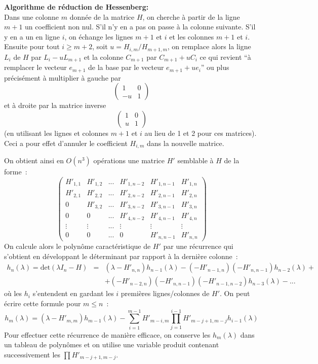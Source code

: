 \documentclass[a4paper,11pt]{article}
\begin{document}
\begin{giacjshere}
{\bf Algorithme de réduction de Hessenberg:}\\
Dans une colonne $m$ donnée de la matrice $H$, 
on cherche à partir de la ligne
$m+1$ un coefficient non nul. S'il n'y en a pas on passe à la colonne
suivante. S'il y en a un en ligne $i$, on échange les lignes $m+1$
et $i$ et les colonnes $m+1$ et $i$. Ensuite pour tout $i\geq m+2$,
soit $u=H_{i,m}/H_{m+1,m}$, on remplace alors la ligne $L_i$ de $H$
par $L_i-uL_{m+1}$ et la colonne $C_{m+1}$ par $C_{m+1}+uC_i$
ce qui revient ``à remplacer le vecteur $e_{m+1}$ de la base
par le vecteur $e_{m+1}+ue_i$'' ou plus pr\'ecis\'ement
\`a multiplier \`a gauche par 
$$\left(\begin{array}{cc}
1 & 0 \\ -u & 1\end{array}\right)$$ 
et \`a droite par la matrice inverse
$$\left(\begin{array}{cc}
1 & 0 \\ u & 1\end{array}\right)$$ 
(en utilisant les lignes et colonnes
$m+1$ et $i$ au lieu de 1 et 2 pour ces matrices). 
Ceci a pour effet d'annuler le coefficient $H_{i,m}$
dans la nouvelle matrice.

On obtient ainsi en $O(n^3)$ opérations
une matrice $H'$ semblable à $H$ de la forme~:
\[
\left(\begin{array}{cccccc}
H'_{1,1} & H'_{1,2} & ... & H'_{1,n-2} & H'_{1,n-1} & H'_{1,n}\\
H'_{2,1} & H'_{2,2} & ... & H'_{2,n-2} & H'_{2,n-1} & H'_{2,n} \\
0       & H'_{3,2} & ... & H'_{3,n-2} & H'_{3,n-1} & H'_{3,n} \\
0       & 0       & ... & H'_{4,n-2} & H'_{4,n-1} & H'_{4,n} \\
\vdots  & \vdots  & ... & \vdots & \vdots  &  \vdots \\
0       & 0       & ... & 0 & H'_{n,n-1} & H'_{n,n}
\end{array} \right)
\]
On calcule alors le polynôme caractéristique de $H'$ par une récurrence
qui s'obtient en développant le déterminant par rapport à la derni\`ere
colonne~:
\begin{eqnarray*}
 h_n(\lambda) = \mbox{det}(\lambda I_n-H)&=& 
(\lambda-H'_{n,n}) h_{n-1}(\lambda) -(-H'_{n-1,n}) (-H'_{n,n-1}) 
h_{n-2}(\lambda) + \\
& & 
    + (-H'_{n-2,n}) (-H'_{n,n-1}) (-H'_{n-1,n-2}) h_{n-3}(\lambda) - ...
\end{eqnarray*}
où les $h_i$ s'entendent en gardant les $i$ premières lignes/colonnes de $H'$.
On peut \'ecrire cette formule pour $m\leq n$~:
\[ h_m(\lambda)= (\lambda - H'_{m,m}) h_{m-1}(\lambda)
-\sum_{i=1}^{m-1} H'_{m-i,m} \prod_{j=1}^{i-1} H'_{m-j+1,m-j} h_{i-1}(\lambda)\]
Pour effectuer cette r\'ecurrence de mani\`ere efficace, on conserve
les $h_m(\lambda)$ dans un tableau de polyn\^omes et on utilise une 
variable produit contenant successivement les $\prod H'_{m-j+1,m-j}$.


\end{giacjshere}
\end{document}
